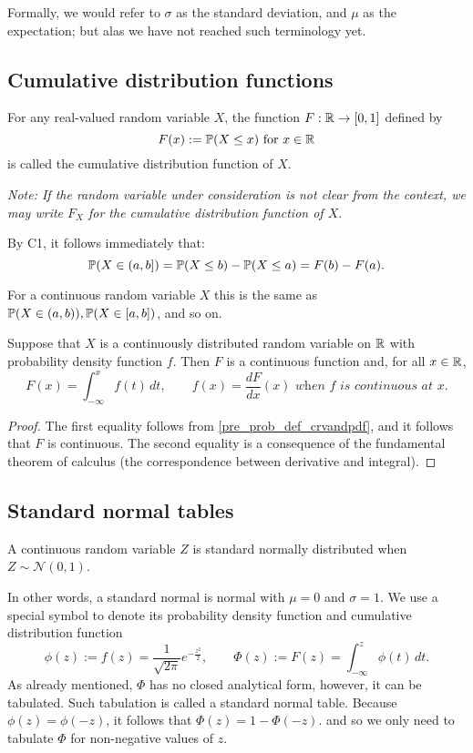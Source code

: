 \documentclass[10pt, a4paper]{article}
\begin{document}
Formally,
we would refer to $\sigma$ as the standard deviation,
and $\mu$ as the expectation;
but alas we have not reached such terminology yet.

\subsection{Cumulative distribution functions}
\begin{definition}
    For any real-valued random variable $X$,
    the function $F: \R \rightarrow [0, 1]$ defined by
    \[
    F(x) := \P(X \leq x)\text{ for } x \in \R
    \]
    is called the cumulative distribution function of $X$.
\end{definition}

\textit{Note: If the random variable under consideration is not clear from the context,
we may write $F_X$ for the cumulative distribution function of $X$}.

By C1,
it follows immediately that:
\[
\P(X \in (a, b]) = \P(X \leq b) - \P(X \leq a) = F(b) - F(a).
\]

For a continuous random variable $X$ this is the same as $\P(X \in (a, b)), \P(X \in [a, b])$,
and so on.

\begin{theorem}
    Suppose that $X$ is a continuously distributed random variable on $\R$ with probability density function $f$.
    Then $F$ is a continuous function and,
    for all $x \in \R$,
    \[
    F(x) = \int_{-\infty}^{x}f(t)\,dt,\qquad f(x) = \frac{dF}{dx}(x)\textit{ when $f$ is continuous at $x$}.
    \]
    \begin{proof}
        The first equality follows from \autoref{pre_prob_def_crvandpdf},
        and it follows that $F$ is continuous.
        The second equality is a consequence of the fundamental theorem of calculus (the correspondence between derivative and integral).
    \end{proof}
\end{theorem}

\subsection{Standard normal tables}
\begin{definition}
    A continuous random variable $Z$ is standard normally distributed when $Z \sim \mathcal{N}(0, 1)$.
\end{definition}
In other words,
a standard normal is normal with $\mu = 0$ and $\sigma = 1$.
We use a special symbol to denote its probability density function and cumulative distribution function
\[
\phi(z) := f(z) = \frac{1}{\sqrt{2\pi}}e ^ {-\frac{z ^ 2}{2}},\qquad\Phi(z) := F(z) = \int_{-\infty}^{z}\phi(t)\,dt.
\]
As already mentioned,
$\Phi$ has no closed analytical form,
however,
it can be tabulated.
Such tabulation is called a standard normal table.
Because $\phi(z) = \phi(-z)$,
it follows that $\Phi(z) = 1 - \Phi(-z)$.
and so we only need to tabulate $\Phi$ for non-negative values of $z$.
\end{document}
